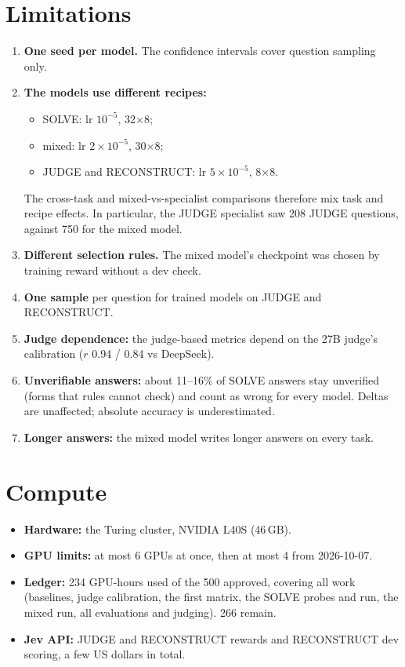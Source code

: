 \documentclass[10pt,a4paper]{article}
\begin{document}
\section{Limitations}
\begin{enumerate}
\item \textbf{One seed per model.} The confidence intervals cover question sampling only.
\item \textbf{The models use different recipes:}
  \begin{itemize}
  \item SOLVE: lr $10^{-5}$, 32$\times$8;
  \item mixed: lr $2\times10^{-5}$, 30$\times$8;
  \item JUDGE and RECONSTRUCT: lr $5\times10^{-5}$, 8$\times$8.
  \end{itemize}
  The cross-task and mixed-vs-specialist comparisons therefore mix task and recipe effects. In particular, the
  JUDGE specialist saw 208 JUDGE questions, against 750 for the mixed model.
\item \textbf{Different selection rules.} The mixed model's checkpoint was chosen by training reward without a dev
      check.
\item \textbf{One sample} per question for trained models on JUDGE and RECONSTRUCT.
\item \textbf{Judge dependence:} the judge-based metrics depend on the 27B judge's calibration ($r$ 0.94 / 0.84 vs
      DeepSeek).
\item \textbf{Unverifiable answers:} about 11--16\% of SOLVE answers stay unverified (forms that rules cannot check)
      and count as wrong for every model. Deltas are unaffected; absolute accuracy is underestimated.
\item \textbf{Longer answers:} the mixed model writes longer answers on every task.
\end{enumerate}

\section{Compute}
\begin{itemize}
\item \textbf{Hardware:} the Turing cluster, NVIDIA L40S (46\,GB).
\item \textbf{GPU limits:} at most 6 GPUs at once, then at most 4 from 2026-10-07.
\item \textbf{Ledger:} 234 GPU-hours used of the 500 approved, covering all work (baselines, judge calibration, the
      first matrix, the SOLVE probes and run, the mixed run, all evaluations and judging). 266 remain.
\item \textbf{Jev API:} JUDGE and RECONSTRUCT rewards and RECONSTRUCT dev scoring, a few US dollars in total.
\end{itemize}
\end{document}
